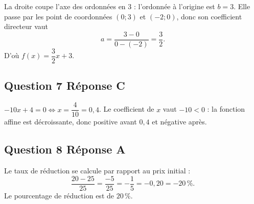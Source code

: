 \documentclass[10pt]{article}
\begin{document}
La droite coupe l'axe des ordonnées en 3 : l'ordonnée à l'origine est $b = 3$. Elle passe par les point de coordonnées $(0 ; 3)$ et $(-2 ; 0)$, donc son coefficient directeur vaut
\[a = \dfrac{3 - 0}{0 - (-2)} = \dfrac{3}{2}.\]
D'où $f(x) = \dfrac{3}{2}x + 3$.

\subsection*{Question 7 \quad Réponse C}

$-10x + 4 = 0 \iff x = \dfrac{4}{10} = 0,4$. Le coefficient de $x$ vaut $-10 < 0$ : la
fonction affine est décroissante, donc positive avant $0,4$ et négative après.

\subsection*{Question 8 \quad Réponse A}

Le taux de réduction se calcule par rapport au prix initial :
\[\dfrac{20-25}{25} = \dfrac{-5}{25} = -\dfrac{1}{5} = -0,20 = -20\,\%.\]
Le pourcentage de réduction est de $20\,\%$.
\end{document}
